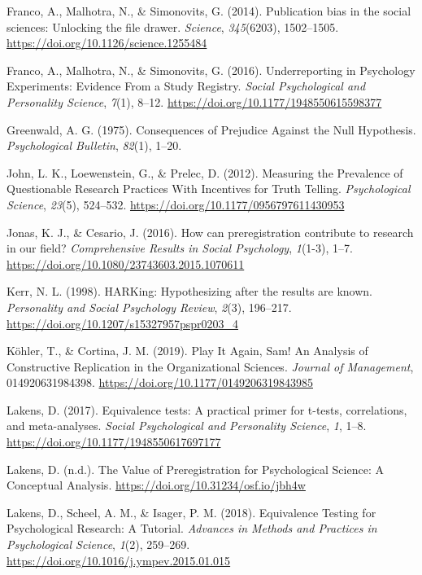 \documentclass[british,,man,floatsintext]{apa6}
\begin{document}
\leavevmode\hypertarget{ref-Franco2014}{}%
Franco, A., Malhotra, N., \& Simonovits, G. (2014). Publication bias in the social sciences: Unlocking the file drawer. \emph{Science}, \emph{345}(6203), 1502--1505. \url{https://doi.org/10.1126/science.1255484}

\leavevmode\hypertarget{ref-Franco2016}{}%
Franco, A., Malhotra, N., \& Simonovits, G. (2016). Underreporting in Psychology Experiments: Evidence From a Study Registry. \emph{Social Psychological and Personality Science}, \emph{7}(1), 8--12. \url{https://doi.org/10.1177/1948550615598377}

\leavevmode\hypertarget{ref-Greenwald1975}{}%
Greenwald, A. G. (1975). Consequences of Prejudice Against the Null Hypothesis. \emph{Psychological Bulletin}, \emph{82}(1), 1--20.

\leavevmode\hypertarget{ref-John2012}{}%
John, L. K., Loewenstein, G., \& Prelec, D. (2012). Measuring the Prevalence of Questionable Research Practices With Incentives for Truth Telling. \emph{Psychological Science}, \emph{23}(5), 524--532. \url{https://doi.org/10.1177/0956797611430953}

\leavevmode\hypertarget{ref-Jonas2016}{}%
Jonas, K. J., \& Cesario, J. (2016). How can preregistration contribute to research in our field? \emph{Comprehensive Results in Social Psychology}, \emph{1}(1-3), 1--7. \url{https://doi.org/10.1080/23743603.2015.1070611}

\leavevmode\hypertarget{ref-Kerr1998}{}%
Kerr, N. L. (1998). HARKing: Hypothesizing after the results are known. \emph{Personality and Social Psychology Review}, \emph{2}(3), 196--217. \url{https://doi.org/10.1207/s15327957pspr0203_4}

\leavevmode\hypertarget{ref-Kohler2019}{}%
Köhler, T., \& Cortina, J. M. (2019). Play It Again, Sam! An Analysis of Constructive Replication in the Organizational Sciences. \emph{Journal of Management}, 014920631984398. \url{https://doi.org/10.1177/0149206319843985}

\leavevmode\hypertarget{ref-R-TOSTER}{}%
Lakens, D. (2017). Equivalence tests: A practical primer for t-tests, correlations, and meta-analyses. \emph{Social Psychological and Personality Science}, \emph{1}, 1--8. \url{https://doi.org/10.1177/1948550617697177}

\leavevmode\hypertarget{ref-Lakens2019b}{}%
Lakens, D. (n.d.). The Value of Preregistration for Psychological Science: A Conceptual Analysis. \url{https://doi.org/10.31234/osf.io/jbh4w}

\leavevmode\hypertarget{ref-Lakens2018a}{}%
Lakens, D., Scheel, A. M., \& Isager, P. M. (2018). Equivalence Testing for Psychological Research: A Tutorial. \emph{Advances in Methods and Practices in Psychological Science}, \emph{1}(2), 259--269. \url{https://doi.org/10.1016/j.ympev.2015.01.015}
\end{document}
